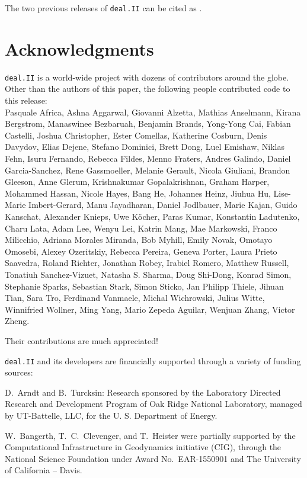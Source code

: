 \documentclass{ansarticle-preprint}
\newcommand{\specialword}[1]{\texttt{#1}}
\newcommand{\dealii}{{\specialword{deal.II}}\xspace}
\begin{document}
The two previous releases of \dealii{} can be cited as
\cite{dealII90,dealII91}.


\section{Acknowledgments}

\dealii{} is a world-wide project with dozens of contributors around the
globe. Other than the authors of this paper, the following people
contributed code to this release:\\
%
%
Pasquale Africa,
Ashna Aggarwal,
Giovanni Alzetta,
Mathias Anselmann,
Kirana Bergstrom,
Manaswinee Bezbaruah,
Benjamin Brands,
Yong-Yong Cai,
Fabian Castelli,
Joshua Christopher,
Ester Comellas,
Katherine Cosburn,
Denis Davydov,
Elias Dejene,
Stefano Dominici,
Brett Dong,
Luel Emishaw,
Niklas Fehn,
Isuru Fernando,
Rebecca Fildes,
Menno Fraters,
Andres Galindo,
Daniel Garcia-Sanchez,
Rene Gassmoeller,
Melanie Gerault,
Nicola Giuliani,
Brandon Gleeson,
Anne Glerum,
Krishnakumar Gopalakrishnan,
Graham Harper,
Mohammed Hassan,
Nicole Hayes,
Bang He,
Johannes Heinz,
Jiuhua Hu,
Lise-Marie Imbert-Gerard,
Manu Jayadharan,
Daniel Jodlbauer,
Marie Kajan,
Guido Kanschat,
Alexander Knieps,
Uwe K{\"o}cher,
Paras Kumar,
Konstantin Ladutenko,
Charu Lata,
Adam Lee,
Wenyu Lei,
Katrin Mang,
Mae Markowski,
Franco Milicchio,
Adriana Morales Miranda,
Bob Myhill,
Emily Novak,
Omotayo Omosebi,
Alexey Ozeritskiy,
Rebecca Pereira,
Geneva Porter,
Laura Prieto Saavedra,
Roland Richter,
Jonathan Robey,
Irabiel Romero,
Matthew Russell,
Tonatiuh Sanchez-Vizuet,
Natasha S. Sharma,
Doug Shi-Dong,
Konrad Simon,
Stephanie Sparks,
Sebastian Stark,
Simon Sticko,
Jan Philipp Thiele,
Jihuan Tian,
Sara Tro,
Ferdinand Vanmaele,
Michal Wichrowski,
Julius Witte,
Winnifried Wollner,
Ming Yang,
Mario Zepeda Aguilar,
Wenjuan Zhang,
Victor Zheng.

Their contributions are much appreciated!


\bigskip

\dealii{} and its developers are financially supported through a
variety of funding sources:

D.~Arndt and B.~Turcksin: Research sponsored by the Laboratory Directed Research and
Development Program of Oak Ridge National Laboratory, managed by UT-Battelle,
LLC, for the U. S. Department of Energy.

W.~Bangerth, T.~C.~Clevenger, and T.~Heister were partially
supported by the Computational Infrastructure
in Geodynamics initiative (CIG), through the National Science
Foundation under Award No.~EAR-1550901 and The
University of California -- Davis.
\end{document}
